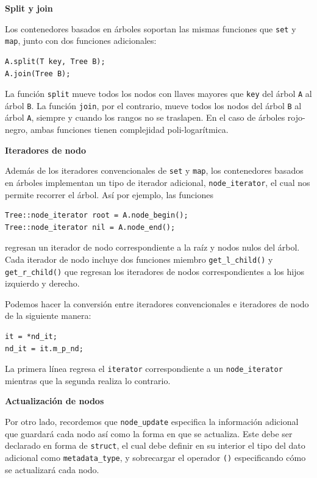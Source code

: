 \documentclass[10pt, letterpaper, twoside]{article}
\begin{document}
\textbf{Split y join}

Los contenedores basados en árboles soportan las mismas funciones que \texttt{set} y \texttt{map}, junto con dos funciones adicionales: 

\begin{lstlisting}
A.split(T key, Tree B);
A.join(Tree B);
\end{lstlisting}

La función \texttt{split} mueve todos los nodos con llaves mayores que \texttt{key} del árbol \texttt{A} al árbol \texttt{B}. La función \texttt{join}, por el contrario, mueve todos los nodos del árbol \texttt{B} al árbol \texttt{A}, siempre y cuando los rangos no se traslapen. En el caso de árboles rojo-negro, ambas funciones tienen complejidad poli-logarítmica.\medskip

\textbf{Iteradores de nodo}

Además de los iteradores convencionales de \texttt{set} y \texttt{map}, los contenedores basados en árboles implementan un tipo de iterador adicional, \texttt{node\_iterator}, el cual nos permite recorrer el árbol. Así por ejemplo, las funciones
\begin{lstlisting}
Tree::node_iterator root = A.node_begin();
Tree::node_iterator nil = A.node_end();
\end{lstlisting}
regresan un iterador de nodo correspondiente a la raíz y nodos nulos del árbol. Cada iterador de nodo incluye dos funciones miembro \texttt{get\_l\_child()} y \texttt{get\_r\_child()} que regresan los iteradores de nodos correspondientes a los hijos izquierdo y derecho.

Podemos hacer la conversión entre iteradores convencionales e iteradores de nodo de la siguiente manera:
\begin{lstlisting}
it = *nd_it;
nd_it = it.m_p_nd;
\end{lstlisting}
La primera línea regresa el \texttt{iterator} correspondiente a un \texttt{node\_iterator} mientras que la segunda realiza lo contrario.\medskip

\textbf{Actualización de nodos}

Por otro lado, recordemos que \texttt{node\_update} especifica la información adicional que guardará cada nodo así como la forma en que se actualiza. Este debe ser declarado en forma de \texttt{struct}, el cual debe definir en su interior el tipo del dato adicional como \texttt{metadata\_type}, y sobrecargar el operador \texttt{()} especificando cómo se actualizará cada nodo. 
\end{document}
